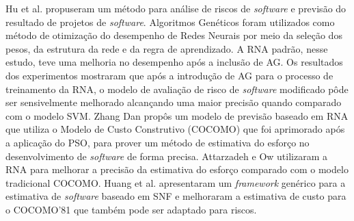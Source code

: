 Hu et al. \cite{hu2007software} propuseram um método para análise de riscos de \textit{software} e previsão do resultado de projetos de \textit{software}. Algoritmos Genéticos foram utilizados como método de otimização do desempenho de Redes Neurais por meio da seleção dos pesos, da estrutura da rede e da regra de aprendizado. A RNA padrão, nesse estudo, teve uma melhoria no desempenho após a inclusão de AG. Os resultados dos experimentos mostraram que após a introdução de AG para o processo de treinamento da RNA, o modelo de avaliação de risco de \textit{software} modificado pôde ser sensivelmente melhorado alcançando uma maior precisão quando comparado com o modelo SVM. Zhang Dan \cite{dan2013improving} propôs um modelo de previsão baseado em RNA que utiliza o Modelo de Custo Construtivo (COCOMO) que foi aprimorado após a aplicação do PSO, para prover um método de estimativa do esforço no desenvolvimento de \textit{software} de forma precisa. Attarzadeh e Ow \cite{attarzadeh2010novel} utilizaram a RNA para melhorar a precisão da estimativa do esforço comparado com o modelo tradicional COCOMO. Huang et al. \cite{huang2004neuro} apresentaram um \textit{framework} genérico para a estimativa de \textit{software} baseado em SNF e melhoraram a estimativa de custo para o COCOMO'81 que também pode ser adaptado para riscos.

